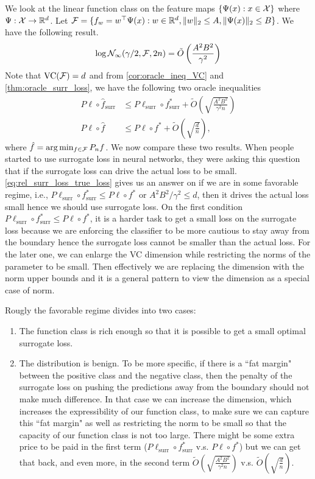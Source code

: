 \documentclass[twoside]{article}
\newcommand{\VC}{\mathrm{VC}}
\newcommand{\surr}{\mathrm{surr}}
\begin{document}
We look at the linear function class on the feature maps $\{\Psi(x):x\in \mathcal{X}\}$ where $\Psi:\mathcal{X}\to \mathbb{R}^d$. Let $\mathcal{F}=\{f_w=w^\top\Psi(x):w\in \mathbb{R}^d, \|w\|_2\le A, \|\Psi(x)\|_2\le B\}$. We have the following result.
\begin{equation*}
    \log \mathcal{N}_\infty (\gamma/2,\mathcal{F},2n)=\tilde O\left(\frac{A^2B^2}{\gamma^2}\right)
\end{equation*}
Note that $\VC(\cF)=d$ and from \cref{cor:oracle_ineq_VC} and \cref{thm:oracle_surr_loss}, we have the following two oracle inequalities
\begin{align}
    P\ell\circ \hat f_{\surr}&\le P\ell_\surr\circ f_\surr^*+\tilde O\left(\sqrt{\frac{A^2B^2}{\gamma^2n}}\right)\label{eq:rel_surr_loss_true_loss}\\
    P\ell\circ \hat f&\le P\ell\circ f^*+\tilde O\left(\sqrt{\frac{d}{n}}\right),
\end{align}
where $\hat f = \arg\min_{f\in \mathcal{F}} P_nf$. We now compare these two results. When people started to use surrogate loss in neural networks, they were asking this question that if the surrogate loss can drive the actual loss to be small. \cref{eq:rel_surr_loss_true_loss} gives us an answer on if we are in some favorable regime, i.e., $P\ell_{\surr}\circ f^*_\surr\le P\ell\circ f^*$ or $A^2B^2/\gamma^2\le d$, then it drives the actual loss small hence we should use surrogate loss.  On the first condition $P\ell_{\surr}\circ f^*_\surr\le P\ell\circ f^*$, it is a harder task to get a small loss on the surrogate loss because we are enforcing the classifier to be more cautious to stay away from the boundary hence the surrogate loss cannot be smaller than the actual loss. For the later one, we can enlarge the VC dimension while restricting the norms of the parameter to be small. Then effectively we are replacing the dimension with the norm upper bounds and it is a general pattern to view the dimension as a special case of norm. 

Rougly the favorable regime divides into two cases:
\begin{enumerate}
    \item The function class is rich enough so that it is possible to get a small optimal surrogate loss.
    \item The distribution is benign. To be more specific, if there is a ``fat margin" between the positive class and the negative class, then the penalty of the surrogate loss on pushing the predictions away from the boundary should not make much difference. In that case we can increase the dimension, which increases the expressibility of our function class, to make sure we can capture this ``fat margin" as well as restricting the norm to be small so that the capacity of our function class is not too large. There might be some extra price to be paid in the first term ($P\ell_\surr\circ f_\surr^*$ v.s. $P\ell\circ  f^*$) but we can get that back, and even more, in the second term $\tilde O\left(\sqrt{\frac{A^2B^2}{\gamma^2n}}\right)$ v.s. $\tilde O\left(\sqrt{\frac{d}{n}}\right)$.
\end{enumerate}
\end{document}
